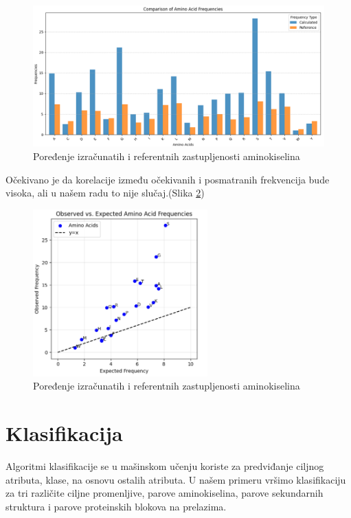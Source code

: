 \documentclass[a4paper,12pt]{article}
\begin{document}
\begin{figure}[htbp]
    \centering
    \includegraphics[width=1\textwidth]{./images/aafreq.barplot.png}
    \caption{Poređenje izračunatih i referentnih zastupljenosti aminokiselina}
    \label{Slika:aafreq.barplot}
\end{figure}

Očekivano je da korelacije između očekivanih i posmatranih frekvencija bude visoka, ali u našem radu to nije slučaj.(Slika \ref{Slika:obsvsexp})


\begin{figure}[htbp]
    \centering
    \includegraphics[width=0.6\textwidth]{./images/obsvsexp.png}
    \caption{Poređenje izračunatih i referentnih zastupljenosti aminokiselina}
    \label{Slika:obsvsexp}
\end{figure}


\newpage
\section{Klasifikacija}
Algoritmi klasifikacije se u mašinskom učenju koriste za predviđanje ciljnog atributa, klase, na osnovu ostalih atributa. U našem primeru vršimo klasifikaciju za tri različite ciljne promenljive, parove aminokiselina, parove sekundarnih struktura i parove proteinskih blokova na prelazima.
\end{document}
